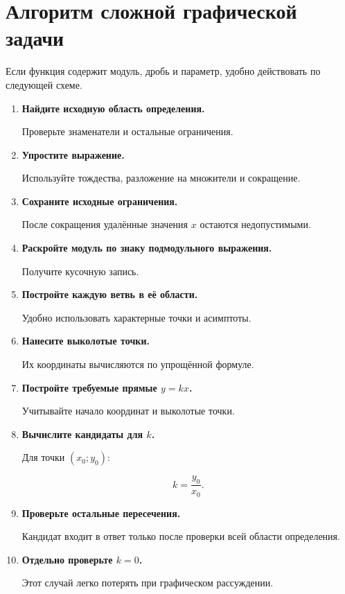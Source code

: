 \documentclass[a4paper,12pt]{article}
\newcommand{\key}[1]{\textcolor{darkaccent}{\textbf{#1}}}
\begin{document}

\section{Алгоритм сложной графической задачи}

Если функция содержит модуль, дробь и параметр, удобно действовать по следующей схеме.

\begin{enumerate}
\item \key{Найдите исходную область определения.}

Проверьте знаменатели и остальные ограничения.

\item \key{Упростите выражение.}

Используйте тождества, разложение на множители и сокращение.

\item \key{Сохраните исходные ограничения.}

После сокращения удалённые значения \(x\) остаются недопустимыми.

\item \key{Раскройте модуль по знаку подмодульного выражения.}

Получите кусочную запись.

\item \key{Постройте каждую ветвь в её области.}

Удобно использовать характерные точки и асимптоты.

\item \key{Нанесите выколотые точки.}

Их координаты вычисляются по упрощённой формуле.

\item \key{Постройте требуемые прямые \(y=kx\).}

Учитывайте начало координат и выколотые точки.

\item \key{Вычислите кандидаты для \(k\).}

Для точки \((x_0;y_0)\):

\[
k=\frac{y_0}{x_0}.
\]

\item \key{Проверьте остальные пересечения.}

Кандидат входит в ответ только после проверки всей области определения.

\item \key{Отдельно проверьте \(k=0\).}

Этот случай легко потерять при графическом рассуждении.
\end{enumerate}
\end{document}
